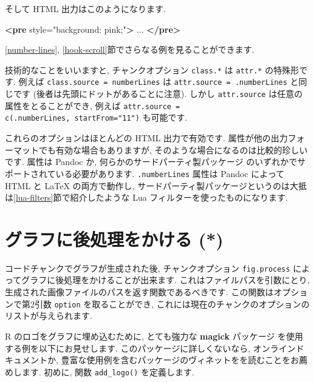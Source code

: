 \documentclass[
  11pt,
  lualatex,ja=standard,jafont=noto]{bxjsreport}
\newenvironment{Shaded}{\begin{snugshade}}{\end{snugshade}}
\newcommand{\KeywordTok}[1]{\textcolor[rgb]{0.13,0.29,0.53}{\textbf{#1}}}
\newcommand{\NormalTok}[1]{#1}
\newcommand{\OtherTok}[1]{\textcolor[rgb]{0.56,0.35,0.01}{#1}}
\newcommand{\StringTok}[1]{\textcolor[rgb]{0.31,0.60,0.02}{#1}}
\begin{document}
そして HTML 出力はこのようになります.

\begin{Shaded}
\begin{Highlighting}[]
\KeywordTok{\textless{}pre}\OtherTok{ style=}\StringTok{"background: pink;"}\KeywordTok{\textgreater{}}
\NormalTok{...}
\KeywordTok{\textless{}/pre\textgreater{}}
\end{Highlighting}
\end{Shaded}

\ref{number-lines}, \ref{hook-scroll}節でさらなる例を見ることができます.

技術的なことをいいますと, チャンクオプション \texttt{class.*} は \texttt{attr.*} の特殊形です. 例えば \texttt{class.source = \textquotesingle{}numberLines\textquotesingle{}} は \texttt{attr.source = \textquotesingle{}.numberLines\textquotesingle{}} と同じです (後者は先頭にドットがあることに注意). しかし \texttt{attr.source} は任意の属性をとることができ, 例えば \texttt{attr.source = c(\textquotesingle{}.numberLines\textquotesingle{},\ \textquotesingle{}startFrom="11"\textquotesingle{})} も可能です.

これらのオプションはほとんどの HTML 出力で有効です. 属性が他の出力フォーマットでも有効な場合もありますが, そのような場合になるのは比較的珍しいです. 属性は Pandoc か, 何らかのサードパーティ製パッケージ のいずれかでサポートされている必要があります. \texttt{.numberLines} 属性は Pandoc によって HTML と LaTeX の両方で動作し, サードパーティ製パッケージというのは大抵は\ref{lua-filters}節で紹介したような Lua フィルターを使ったものになります.

\hypertarget{fig-process}{%
\section{グラフに後処理をかける (*)}\label{fig-process}}

コードチャンクでグラフが生成された後, チャンクオプション \texttt{fig.process} によってグラフに後処理をかけることが出来ます. これはファイルパスを引数にとり, 生成された画像ファイルのパスを返す関数であるべきです. この関数はオプションで第2引数 \texttt{option} を取ることができ, これには現在のチャンクのオプションのリストが与えられます.

R のロゴをグラフに埋め込むために, とても強力な \textbf{magick} パッケージ \autocite{R-magick} を使用する例を以下にお見せします. このパッケージに詳しくないなら, オンラインドキュメントか, 豊富な使用例を含むパッケージのヴィネットをを読むことをお薦めします. 初めに, 関数 \texttt{add\_logo()} を定義します.
\end{document}
